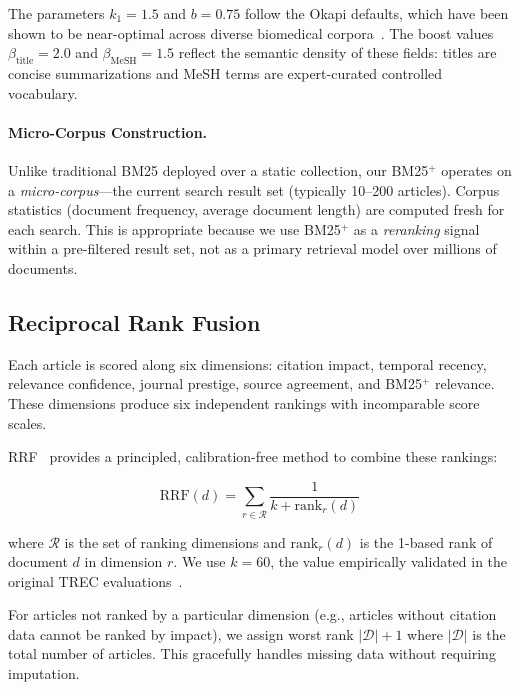 \documentclass[11pt,a4paper]{article}
\begin{document}
The parameters $k_1 = 1.5$ and $b = 0.75$ follow the Okapi defaults, which have been shown to be near-optimal across diverse biomedical corpora~\citep{lin2021bm25}.
The boost values $\beta_{\text{title}} = 2.0$ and $\beta_{\text{MeSH}} = 1.5$ reflect the semantic density of these fields: titles are concise summarizations and MeSH terms are expert-curated controlled vocabulary.

\paragraph{Micro-Corpus Construction.}
Unlike traditional BM25 deployed over a static collection, our BM25$^{+}$ operates on a \emph{micro-corpus}---the current search result set (typically 10--200 articles).
Corpus statistics (document frequency, average document length) are computed fresh for each search.
This is appropriate because we use BM25$^{+}$ as a \emph{reranking} signal within a pre-filtered result set, not as a primary retrieval model over millions of documents.

\subsection{Reciprocal Rank Fusion}
\label{sec:rrf}

Each article is scored along six dimensions: citation impact, temporal recency, relevance confidence, journal prestige, source agreement, and BM25$^{+}$ relevance.
These dimensions produce six independent rankings with incomparable score scales.

RRF~\citep{cormack2009rrf} provides a principled, calibration-free method to combine these rankings:

\begin{equation}
\text{RRF}(d) = \sum_{r \in \mathcal{R}} \frac{1}{k + \text{rank}_r(d)}
\label{eq:rrf}
\end{equation}

where $\mathcal{R}$ is the set of ranking dimensions and $\text{rank}_r(d)$ is the 1-based rank of document $d$ in dimension $r$.
We use $k = 60$, the value empirically validated in the original TREC evaluations~\citep{cormack2009rrf}.

For articles not ranked by a particular dimension (e.g., articles without citation data cannot be ranked by impact), we assign worst rank $|\mathcal{D}| + 1$ where $|\mathcal{D}|$ is the total number of articles.
This gracefully handles missing data without requiring imputation.
\end{document}
